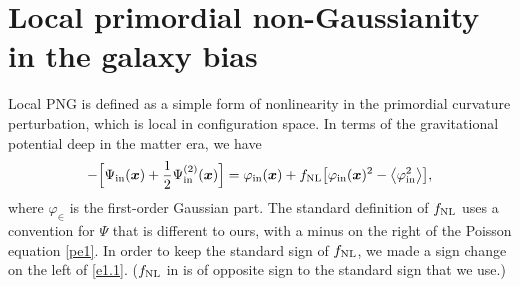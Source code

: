 \section{Local primordial non-Gaussianity in the galaxy bias}
\label{sdb}
%
Local PNG is defined as a simple form of nonlinearity in the primordial curvature perturbation, which is local in configuration space. In terms of the gravitational potential {deep in the matter era}, we have
\begin{equation}
-\Big[\Psi_{{\mathrm{in}}}(\bm {x}) + \frac{1}{2} \Psi^{{(2)}}_{{\mathrm{in}}}(\bm {x})\Big] = \varphi_{{\mathrm{in}}}(\bm {x}) + f_\text{NL}\big[\varphi_{{\mathrm{in}}}(\bm {x})^{2}  - \big\langle \varphi_{{\mathrm{in}}}^{2} \big\rangle\big],
\label{e1.1} 
\end{equation}
where $\varphi_{\in}$ is the first-order Gaussian part.
The standard definition of $f_\text{NL}$ uses a convention for $\Psi$ that is different to ours, with a minus on the right of the Poisson equation \eqref{pe1}. In order to keep the standard sign of $f_\text{NL}$, we made a sign change on the left of \eqref{e1.1}.
($f_\text{NL}$  in  \cite{Villa:2015ppa,Koyama:2018ttg, Umeh:2019jqg} is  of opposite sign to the standard sign that we use.) 
%
